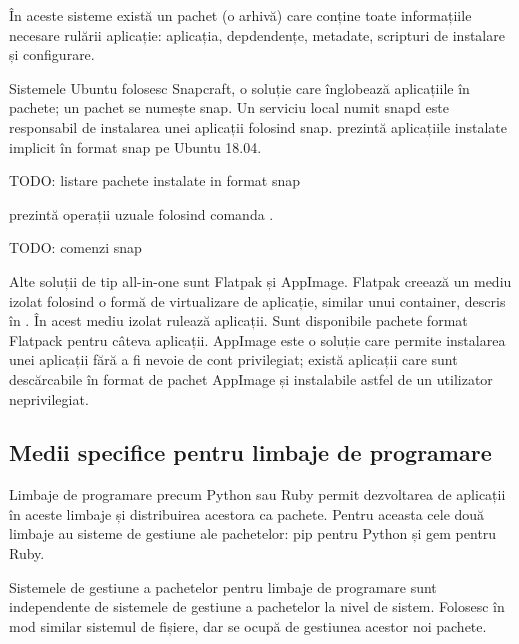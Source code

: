 În aceste sisteme există un pachet (o arhivă) care conține toate informațiile necesare rulării aplicație: aplicația, depdendențe, metadate, scripturi de instalare și configurare.

Sistemele Ubuntu folosesc Snapcraft, o soluție care înglobează aplicațiile în pachete; un pachet se numește snap. Un serviciu local numit snapd este responsabil de instalarea unei aplicații folosind snap.  prezintă aplicațiile instalate implicit în format snap pe Ubuntu 18.04.

\begin{screen}[caption={Pachete instalate în format snap pe Ubuntu 18.04},label={lst:package:snap-list}]
TODO: listare pachete instalate in format snap
\end{screen}

 prezintă operații uzuale folosind comanda .

\begin{screen}[caption={Operații uzule cu snap},label={lst:package:snap}]
TODO: comenzi snap
\end{screen}

Alte soluții de tip all-in-one sunt Flatpak și AppImage. Flatpak creează un mediu izolat folosind o formă de virtualizare de aplicație, similar unui container, descris în . În acest mediu izolat rulează aplicații. Sunt disponibile pachete format Flatpack pentru câteva aplicații. AppImage este o soluție care permite instalarea unei aplicații fără a fi nevoie de cont privilegiat; există aplicații care sunt descărcabile în format de pachet AppImage și instalabile astfel de un utilizator neprivilegiat.

\subsection{Medii specifice pentru limbaje de programare}
\label{sec:package:specific}

Limbaje de programare precum Python sau Ruby permit dezvoltarea de aplicații în aceste limbaje și distribuirea acestora ca pachete. Pentru aceasta cele două limbaje au sisteme de gestiune ale pachetelor: pip pentru Python și gem pentru Ruby.

Sistemele de gestiune a pachetelor pentru limbaje de programare sunt independente de sistemele de gestiune a pachetelor la nivel de sistem. Folosesc în mod similar sistemul de fișiere, dar se ocupă de gestiunea acestor noi pachete.

